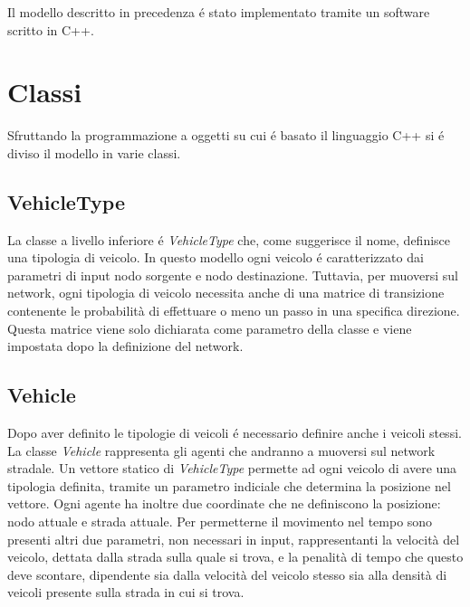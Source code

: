 \documentclass[../main.tex]{subfiles}
\begin{document}
Il modello descritto in precedenza \'e stato implementato tramite un software scritto in C++.
\section{Classi}
Sfruttando la programmazione a oggetti su cui \'e basato il linguaggio C++ si \'e diviso il modello in varie classi.
\subsection{VehicleType}
La classe a livello inferiore \'e \emph{VehicleType} che, come suggerisce il nome, definisce una tipologia di veicolo.
In questo modello ogni veicolo \'e caratterizzato dai parametri di input nodo sorgente e nodo destinazione.
Tuttavia, per muoversi sul network, ogni tipologia di veicolo necessita anche di una matrice di transizione contenente le probabilità di effettuare o meno un passo in una specifica direzione.
Questa matrice viene solo dichiarata come parametro della classe e viene impostata dopo la definizione del network.
\subsection{Vehicle}
Dopo aver definito le tipologie di veicoli \'e necessario definire anche i veicoli stessi.
La classe \emph{Vehicle} rappresenta gli agenti che andranno a muoversi sul network stradale.
Un vettore statico di \emph{VehicleType} permette ad ogni veicolo di avere una tipologia definita, tramite un parametro indiciale che determina la posizione nel vettore.
Ogni agente ha inoltre due coordinate che ne definiscono la posizione: nodo attuale e strada attuale.
Per permetterne il movimento nel tempo sono presenti altri due parametri, non necessari in input, rappresentanti la velocità del veicolo, dettata dalla strada sulla quale si trova, e la penalità di tempo che questo deve scontare, dipendente sia dalla velocità del veicolo stesso sia alla densità di veicoli presente sulla strada in cui si trova.
\end{document}
